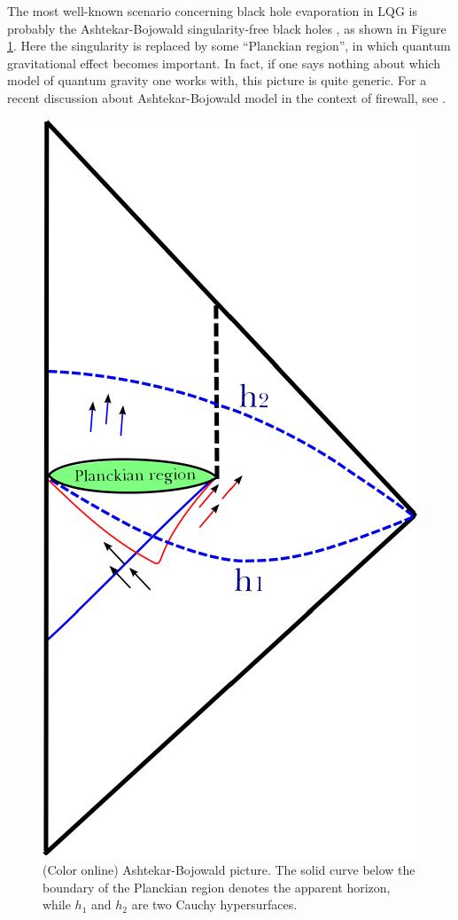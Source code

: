 \documentclass[12pt]{article}
\newcommand{\2}{$^2$}
\newcommand{\3}{$^3$}
\newcommand{\4}{$_4$}
\newcommand{\5}{$_5$}
\begin{document}
The most well-known scenario concerning black hole evaporation in LQG is probably the Ashtekar-Bojowald singularity-free black holes \cite{BA}, as shown in Figure \ref{fig:AB_2}.  Here the singularity is replaced by some ``Planckian region'', in which quantum gravitational effect becomes important. In fact, if one says nothing about which model of quantum gravity one works with, this picture is quite generic. For a recent discussion about Ashtekar-Bojowald model in the context of firewall, see \cite{1410.7062}.

\begin{figure}
\begin{center}
\includegraphics[scale=0.95]{AB_2-eps-converted-to.pdf}
\caption{\label{fig:AB_2}(Color online) Ashtekar-Bojowald picture. The solid curve below the boundary of the Planckian region denotes the apparent horizon, while $h_1$ and $h_2$ are two Cauchy hypersurfaces.}
\end{center}
\end{figure} 
\end{document}
